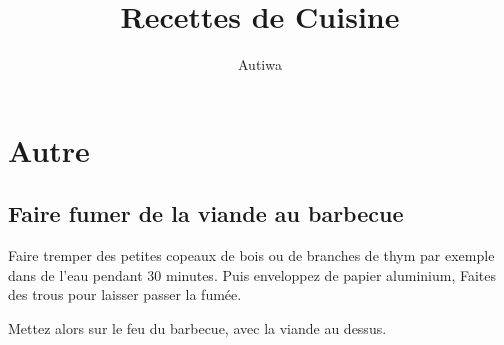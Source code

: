 \documentclass[a4paper,twoside]{report}
\title{Recettes de Cuisine}
\author{Autiwa}
\begin{document}

\tableofcontents

\chapter{Autre}
\section{Faire fumer de la viande au barbecue}
Faire tremper des petites copeaux de bois ou de branches de thym par exemple dans de l'eau pendant 30 minutes. Puis enveloppez de papier aluminium, Faites des trous pour laisser passer la fumée. 

Mettez alors sur le feu du barbecue, avec la viande au dessus.

\end{document}
